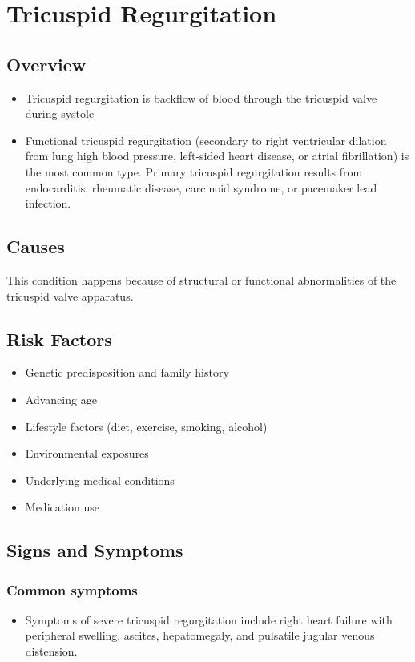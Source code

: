 \chapter{Tricuspid Regurgitation}
\label{sec:Tricuspid Regurgitation}

\section{Overview}


\begin{itemize}[noitemsep]
  \item Tricuspid regurgitation is backflow of blood through the tricuspid valve during systole
  \item Functional tricuspid regurgitation (secondary to right ventricular dilation from lung high blood pressure, left-sided heart disease, or atrial fibrillation) is the most common type. Primary tricuspid regurgitation results from endocarditis, rheumatic disease, carcinoid syndrome, or pacemaker lead infection.
\end{itemize}
\section{Causes}
This condition happens because of structural or functional abnormalities of the tricuspid valve apparatus.     
\section{Risk Factors}

\begin{itemize}[noitemsep]
  \item Genetic predisposition and family history
  \item Advancing age
  \item Lifestyle factors (diet, exercise, smoking, alcohol)
  \item Environmental exposures
  \item Underlying medical conditions
  \item Medication use
\end{itemize}
\section{Signs and Symptoms}

\subsection{Common symptoms}
\begin{itemize}[noitemsep]
  \item Symptoms of severe tricuspid regurgitation include right heart failure with peripheral swelling, ascites, hepatomegaly, and pulsatile jugular venous distension. 
  \end{itemize}


